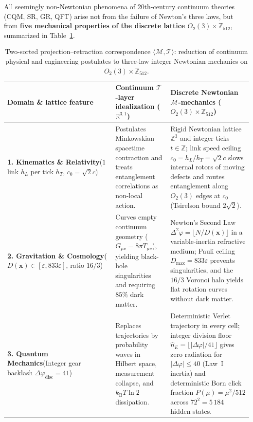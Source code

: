 \documentclass[11pt,a4paper]{article}
\theoremstyle{plain}
\theoremstyle{definition}
\begin{document}
All seemingly non-Newtonian phenomena of 20th-century continuum theories (CQM, SR, GR, QFT) arise not from the failure of Newton's three laws, but from \textbf{five mechanical properties of the discrete lattice $O_2(3)\times\mathbb{Z}_{512}$}, summarized in Table~\ref{tab:newtonian-homeomorphism}.

\begin{table}[htbp]
\centering
\caption{Two-sorted projection--retraction correspondence $\langle\mathcal{M},\mathcal{T}\rangle$: reduction of continuum physical and engineering postulates to three-law integer Newtonian mechanics on $O_2(3)\times\mathbb{Z}_{512}$.}
\label{tab:newtonian-homeomorphism}
\footnotesize
\begin{tabular}{@{}p{}p{}p{}@{}}
\toprule
\textbf{Domain \& lattice feature} & \textbf{Continuum $\mathcal{T}$-layer idealization ($\mathbb{R}^{3,1}$)} & \textbf{Discrete Newtonian $\mathcal{M}$-mechanics ($O_2(3)\times\mathbb{Z}_{512}$)} \\
\midrule
\textbf{1. Kinematics \& Relativity}\newline ($1$ link $h_L$ per tick $h_T$, $c_0=\sqrt{2}c$) &
Postulates Minkowskian spacetime contraction and treats entanglement correlations as non-local action. &
Rigid Newtonian lattice $\mathbb{Z}^3$ and integer ticks $t\in\mathbb{Z}$; link speed ceiling $c_0 = h_L/h_T = \sqrt{2}c$ slows internal rotors of moving defects and routes entanglement along $O_2(3)$ edges at $c_0$ (Tsirelson bound $2\sqrt{2}$). \\
\addlinespace[3pt]
\textbf{2. Gravitation \& Cosmology}\newline ($D(\mathbf{x})\in[\varepsilon,833\varepsilon]$, ratio $16/3$) &
Curves empty continuum geometry ($G_{\mu\nu}=8\pi T_{\mu\nu}$), yielding black-hole singularities and requiring $85\%$ dark matter. &
Newton's Second Law $\Delta^2\varphi = \lfloor N/D(\mathbf{x})\rfloor$ in a variable-inertia refractive medium; Pauli ceiling $D_{\max}=833\varepsilon$ prevents singularities, and the $16/3$ Voronoi halo yields flat rotation curves without dark matter. \\
\addlinespace[3pt]
\textbf{3. Quantum Mechanics}\newline (Integer gear backlash $\Delta\varphi_{\mathrm{disc}}=41$) &
Replaces trajectories by probability waves in Hilbert space, measurement collapse, and $k_{\mathrm{B}}T\ln 2$ dissipation. &
Deterministic Verlet trajectory in every cell; integer division floor $\hat{n}_E = \lfloor|\Delta\varphi|/41\rfloor$ gives zero radiation for $|\Delta\varphi|\le 40$ (Law~I inertia) and deterministic Born click fraction $P(\mu)=\mu^2/512$ across $72^2=5\,184$ hidden states. \\

\end{tabular}
\end{table}
\end{document}

